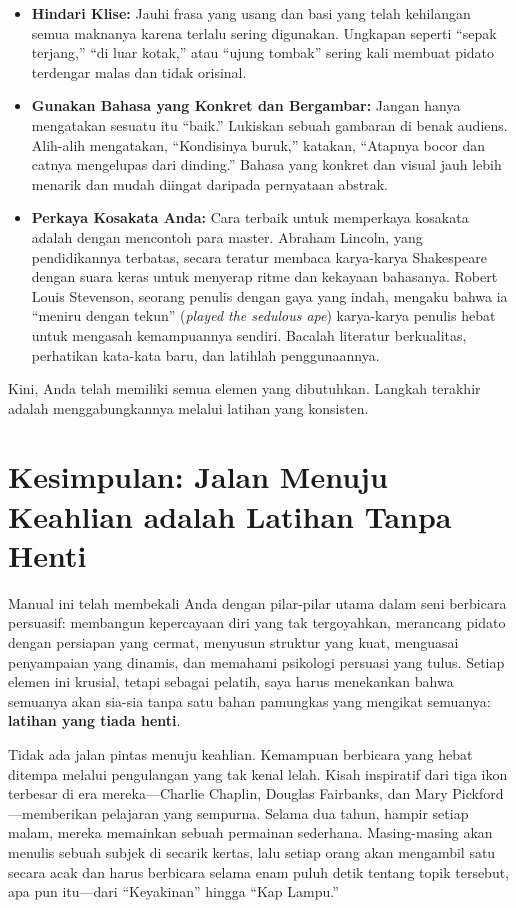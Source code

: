\documentclass[
  letterpaper,
  DIV=11,
  numbers=noendperiod]{scrreprt}
\begin{document}
\begin{itemize}
\item
  \textbf{Hindari Klise:} Jauhi frasa yang usang dan basi yang telah
  kehilangan semua maknanya karena terlalu sering digunakan. Ungkapan
  seperti ``sepak terjang,'' ``di luar kotak,'' atau ``ujung tombak''
  sering kali membuat pidato terdengar malas dan tidak orisinal.
\item
  \textbf{Gunakan Bahasa yang Konkret dan Bergambar:} Jangan hanya
  mengatakan sesuatu itu ``baik.'' Lukiskan sebuah gambaran di benak
  audiens. Alih-alih mengatakan, ``Kondisinya buruk,'' katakan,
  ``Atapnya bocor dan catnya mengelupas dari dinding.'' Bahasa yang
  konkret dan visual jauh lebih menarik dan mudah diingat daripada
  pernyataan abstrak.
\item
  \textbf{Perkaya Kosakata Anda:} Cara terbaik untuk memperkaya kosakata
  adalah dengan mencontoh para master. Abraham Lincoln, yang
  pendidikannya terbatas, secara teratur membaca karya-karya Shakespeare
  dengan suara keras untuk menyerap ritme dan kekayaan bahasanya. Robert
  Louis Stevenson, seorang penulis dengan gaya yang indah, mengaku bahwa
  ia ``meniru dengan tekun'' (\emph{played the sedulous ape})
  karya-karya penulis hebat untuk mengasah kemampuannya sendiri. Bacalah
  literatur berkualitas, perhatikan kata-kata baru, dan latihlah
  penggunaannya.
\end{itemize}

Kini, Anda telah memiliki semua elemen yang dibutuhkan. Langkah terakhir
adalah menggabungkannya melalui latihan yang konsisten.


\chapter{Kesimpulan: Jalan Menuju Keahlian adalah Latihan Tanpa
Henti}\label{kesimpulan-jalan-menuju-keahlian-adalah-latihan-tanpa-henti}

Manual ini telah membekali Anda dengan pilar-pilar utama dalam seni
berbicara persuasif: membangun kepercayaan diri yang tak tergoyahkan,
merancang pidato dengan persiapan yang cermat, menyusun struktur yang
kuat, menguasai penyampaian yang dinamis, dan memahami psikologi
persuasi yang tulus. Setiap elemen ini krusial, tetapi sebagai pelatih,
saya harus menekankan bahwa semuanya akan sia-sia tanpa satu bahan
pamungkas yang mengikat semuanya: \textbf{latihan yang tiada henti}.

Tidak ada jalan pintas menuju keahlian. Kemampuan berbicara yang hebat
ditempa melalui pengulangan yang tak kenal lelah. Kisah inspiratif dari
tiga ikon terbesar di era mereka---Charlie Chaplin, Douglas Fairbanks,
dan Mary Pickford---memberikan pelajaran yang sempurna. Selama dua
tahun, hampir setiap malam, mereka memainkan sebuah permainan sederhana.
Masing-masing akan menulis sebuah subjek di secarik kertas, lalu setiap
orang akan mengambil satu secara acak dan harus berbicara selama enam
puluh detik tentang topik tersebut, apa pun itu---dari ``Keyakinan''
hingga ``Kap Lampu.''
\end{document}
